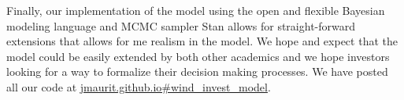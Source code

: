 \documentclass[11pt]{article}
\begin{document}
Finally, our implementation of the model using the open and flexible Bayesian modeling language and MCMC sampler Stan allows for straight-forward extensions that allows for me realism in the model. We hope and expect that the model could be easily extended by both other academics and we hope investors looking for a way to formalize their decision making processes.  We have posted all our code at \url{jmaurit.github.io#wind_invest_model}.
 
\begin{spacing}{1}


\end{spacing}
\end{document}
